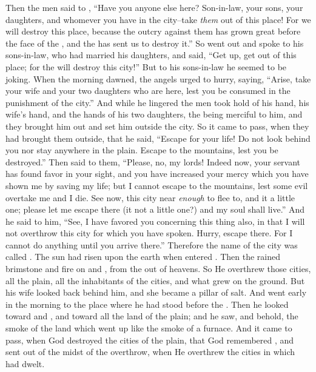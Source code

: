 
\bverse Then the men said to , ``Have you anyone else here? Son-in-law, your sons, your daughters, and whomever you have in the city--take \textit{them} out of this place!
\bverse For we will destroy this place, because the outcry against them has grown great before the face of the \lord, and the \lord has sent us to destroy it.''
\bverse So  went out and spoke to his sons-in-law, who had married his daughters, and said, ``Get up, get out of this place; for the \lord will destroy this city!'' But to his sons-in-law he seemed to be joking.
\bverse When the morning dawned, the angels urged  to hurry, saying, ``Arise, take your wife and your two daughters who are here, lest you be consumed in the punishment of the city.''
\bverse And while he lingered the men took hold of his hand, his wife's hand, and the hands of his two daughters, the \lord being merciful to him, and they brought him out and set him outside the city.
\bverse So it came to pass, when they had brought them outside, that he said, ``Escape for your life! Do not look behind you nor stay anywhere in the plain. Escape to the mountains, lest you be destroyed.''
\bverse Then  said to them, ``Please, no, my lords!
\bverse Indeed now, your servant has found favor in your sight, and you have increased your mercy which you have shown me by saving my life; but I cannot escape to the mountains, lest some evil overtake me and I die.
\bverse See now, this city \is near \textit{enough} to flee to, and it \is a little one; please let me escape there (\is it not a little one?) and my soul shall live.''
\bverse And he said to him, ``See, I have favored you concerning this thing also, in that I will not overthrow this city for which you have spoken.
\bverse Hurry, escape there. For I cannot do anything until you arrive there.'' Therefore the name of the city was called .
\bverse The sun had risen upon the earth when  entered . 
\bverse Then the \lord rained brimstone and fire on  and , from the \lord out of heavens.
\bverse So He overthrew those cities, all the plain, all the inhabitants of the cities, and what grew on the ground.
\bverse But his wife looked back behind him, and she became a pillar of salt.
\bverse And  went early in the morning to the place where he had stood before the \lord.
\bverse Then he looked toward  and , and toward all the land of the plain; and he saw, and behold, the smoke of the land which went up like the smoke of a furnace.
\bverse And it came to pass, when God destroyed the cities of the plain, that God remembered , and sent  out of the midst of the overthrow, when He overthrew the cities in which  had dwelt.


\bverse 
\bverse 
\bverse 
\bverse 
\bverse 
\bverse 
\bverse 
\bverse 
\bverse 
